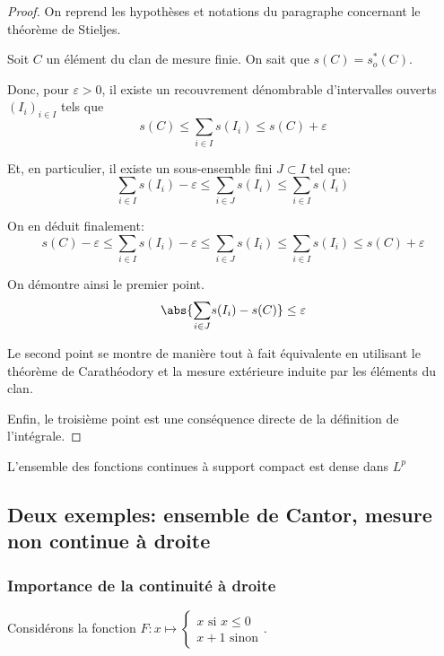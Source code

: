 \begin{proof}
On reprend les hypothèses et notations du paragraphe concernant le théorème de Stieljes.

Soit $C$ un élément du clan de mesure finie. On sait que $s(C)=s_o^{*}(C)$.

Donc, pour $\varepsilon>0$, il existe un recouvrement dénombrable d'intervalles ouverts $\left(I_i\right)_{i \in I}$ tels que 
\[
s(C) \leq \displaystyle{\sum \limits_{i \in I}} s(I_i) \leq s(C) +  \varepsilon
\]


Et, en particulier, il existe un sous-ensemble fini $J \subset I$ tel que:
\[
\displaystyle{\sum \limits_{i \in I}} s(I_i)-\varepsilon \leq \displaystyle{\sum \limits_{i \in J}} s(I_i) \leq \displaystyle{\sum \limits_{i \in I}} s(I_i)
\]

On en déduit finalement:
\[
s(C)-\varepsilon \leq \displaystyle{\sum \limits_{i \in I}} s(I_i)-\varepsilon \leq \displaystyle{\sum \limits_{i \in J}} s(I_i) \leq \displaystyle{\sum \limits_{i \in I}} s(I_i) \leq s(C) +  \varepsilon
\]

On démontre ainsi le premier point.
\[
\abs{\displaystyle{\sum \limits_{i \in J}} s(I_i)-s(C)} \leq \varepsilon
\]

Le second point se montre de manière tout à fait équivalente en utilisant le théorème de Carathéodory et la mesure extérieure induite par les éléments du clan.

Enfin, le troisième point est une conséquence directe de la définition de l'intégrale.
\end{proof}

\begin{prop}
L'ensemble des fonctions continues à support compact est dense dans $L^p$

\end{prop}




\subsection{Deux exemples: ensemble de Cantor, mesure non continue à droite}

\subsubsection{Importance de la continuité à droite}

Considérons la fonction $F: x \mapsto \begin{cases}x \text{ si }x \leq 0\\
x+1 \text{ sinon}\end{cases}$.

